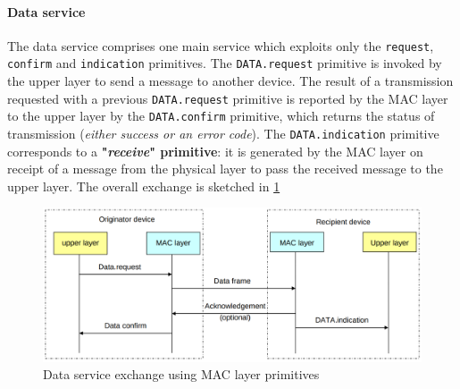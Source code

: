 \documentclass[10pt,a4paper]{report}
\theoremstyle{definition}
\begin{document}
\paragraph{Data service}\label{sec:data-service}
The data service comprises one main service which exploits only the \texttt{request}, \texttt{confirm} and \texttt{indication} primitives.
The \texttt{DATA.request} primitive is invoked by the upper layer to send a message to another device. The result of a transmission requested with a previous \texttt{DATA.request} primitive is reported by the MAC layer to the upper layer by the \texttt{DATA.confirm} primitive, which returns the status of transmission (\textit{either success or an error code}). The \texttt{DATA.indication} primitive corresponds to a \textbf{"\textit{receive}" primitive}: it is generated by the MAC layer on receipt of a message from the physical layer to pass the received message to the upper layer. The overall exchange is sketched in \ref{data-service-exchange}
\begin{figure}[h]
	\centering\includegraphics[scale=0.30]{images/Pasted image 20230417092320.png}
	\caption{Data service exchange using MAC layer primitives}
	\label{data-service-exchange}
\end{figure}
\end{document}
